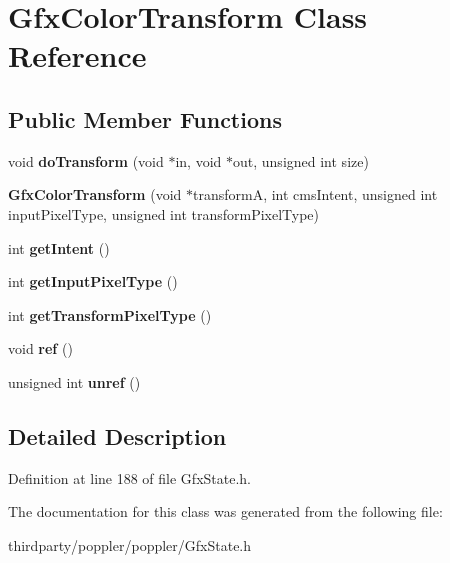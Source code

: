 \hypertarget{class_gfx_color_transform}{}\section{Gfx\+Color\+Transform Class Reference}
\label{class_gfx_color_transform}
\subsection*{Public Member Functions}
\begin{DoxyCompactItemize}
\item 
\mbox{\label{class_gfx_color_transform_a341e0368791dee2795d059e1cfa15ef8}} 
void {\bfseries do\+Transform} (void $\ast$in, void $\ast$out, unsigned int size)
\item 
\mbox{\label{class_gfx_color_transform_ad44ec4983c4191efaef957beeb310832}} 
{\bfseries Gfx\+Color\+Transform} (void $\ast$transformA, int cms\+Intent, unsigned int input\+Pixel\+Type, unsigned int transform\+Pixel\+Type)
\item 
\mbox{\label{class_gfx_color_transform_aacf790ba0179ed58ec7c1d2f51481c9e}} 
int {\bfseries get\+Intent} ()
\item 
\mbox{\label{class_gfx_color_transform_a8cede9393998289afb3ce030d6505b6d}} 
int {\bfseries get\+Input\+Pixel\+Type} ()
\item 
\mbox{\label{class_gfx_color_transform_ad1738d2a332f78cebeac406d7c5733ab}} 
int {\bfseries get\+Transform\+Pixel\+Type} ()
\item 
\mbox{\label{class_gfx_color_transform_a9a38fd3c0e71b70fac30451e73c5b048}} 
void {\bfseries ref} ()
\item 
\mbox{\label{class_gfx_color_transform_a1e119cb25989208ff32e09adc9ef1ff5}} 
unsigned int {\bfseries unref} ()
\end{DoxyCompactItemize}


\subsection{Detailed Description}


Definition at line 188 of file Gfx\+State.\+h.



The documentation for this class was generated from the following file\+:\begin{DoxyCompactItemize}
\item 
thirdparty/poppler/poppler/Gfx\+State.\+h\end{DoxyCompactItemize}

